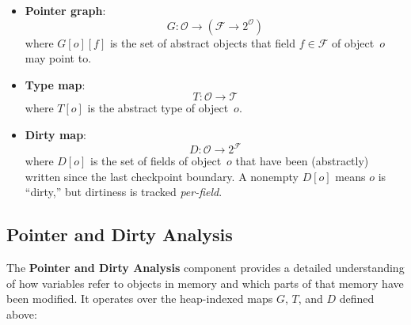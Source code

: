 \begin{itemize}
    \item \textbf{Pointer graph}:
    \[
        G : \mathcal{O} \to (\mathcal{F} \to 2^{\mathcal{O}})
    \]
    where $G[o][f]$ is the set of abstract objects that field $f \in \mathcal{F}$ of object~$o$
    may point to.  

    \item \textbf{Type map}:
    \[
        T : \mathcal{O} \to \mathcal{T}
    \]
    where $T[o]$ is the abstract type of object~$o$.

    \item \textbf{Dirty map}:
    \[
        D : \mathcal{O} \to 2^{\mathcal{F}}
    \]
    where $D[o]$ is the set of fields of object~$o$ that have been (abstractly) written since
    the last checkpoint boundary.  
    A nonempty $D[o]$ means $o$ is ``dirty,'' but dirtiness is tracked \emph{per-field}.
\end{itemize}

\subsection{Pointer and Dirty Analysis}

The \textbf{Pointer and Dirty Analysis} component provides a detailed understanding
of how variables refer to objects in memory and which parts of that memory have been modified.
It operates over the heap-indexed maps $G$, $T$, and $D$ defined above:

